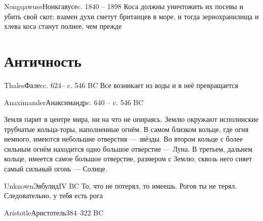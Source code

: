 \documentclass[aspectratio=169]{beamer}
\begin{document}
\begin{Person}{Nongqawuse}{Нонкгавусе}{c. 1840 -- 1898}
Коса должны уничтожить их посевы и убить свой скот; взамен духи сметут британцев в море, и тогда зернохранилища и хлева коса станут полнее, чем прежде
\end{Person}

\section{Античность}

\begin{Person}{Thales}{Фалеc}{c. 624-- c. 546 BC}
Все возникает из воды и в неё превращается
\end{Person}

\begin{Person}{Anaximander}{Анаксимандр}{c. 640 -- c. 546 BC}

Земля парит в центре мира, ни на что не опираясь. Землю окружают исполинские трубчатые кольца-торы, наполненные огнём. В самом близком кольце, где огня немного, имеются небольшие отверстия — звёзды. Во втором кольце с более сильным огнём находится одно большое отверстие — Луна. В третьем, дальнем кольце, имеется самое большое отверстие, размером с Землю; сквозь него сияет самый сильный огонь — Солнце.
\end{Person}

\begin{Person}{Unknown}{Эвбулид}{IV BC}
То, что не потерял, то имеешь. Рогов ты не терял. Следовательно, у тебя есть рога
\end{Person}

\begin{Person}{Aristotle}{Аристотель}{384--322 BC}
\begin{Reason}
\end{Reason}
\end{Person}

\end{document}
